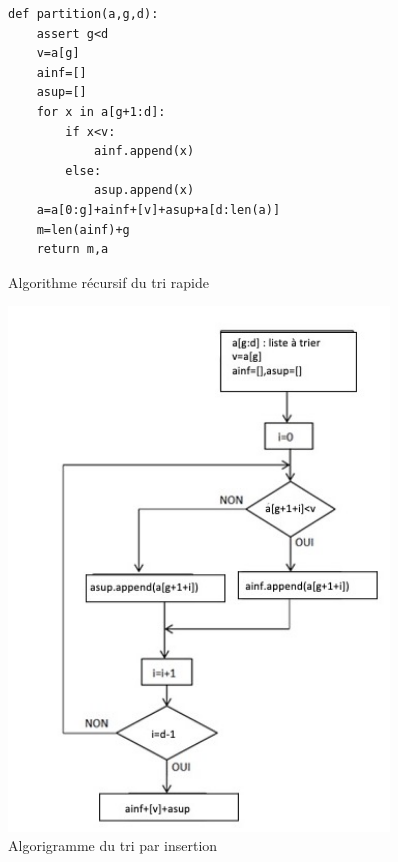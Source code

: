 \begin{figure}[!htb]
\begin{minipage}{0.5\textwidth}
\begin{algorithme}

\begin{center}
\begin{lstlisting}
def partition(a,g,d):
    assert g<d
    v=a[g]
    ainf=[]
    asup=[]
    for x in a[g+1:d]:
        if x<v:
            ainf.append(x)
        else:
            asup.append(x)
    a=a[0:g]+ainf+[v]+asup+a[d:len(a)]
    m=len(ainf)+g
    return m,a
\end{lstlisting}
\end{center}


\end{algorithme}

\begin{algorithme}{Algorithme récursif du tri rapide}
\begin{center}
		
\end{center}
\end{algorithme}


\end{minipage}
\begin{minipage}{0.5\textwidth}
\begin{center}
\includegraphics[width=0.9\textwidth]{images/algorigramme_rapide.jpg}
\caption{Algorigramme du tri par insertion}
\end{center}
\end{minipage}
\end{figure}
